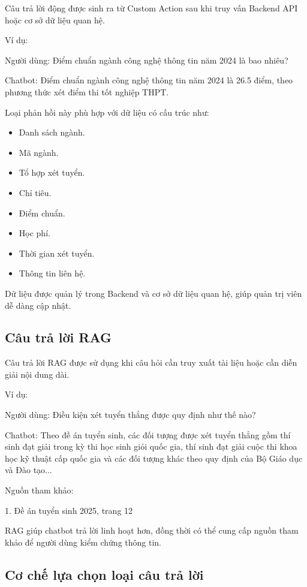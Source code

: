 Câu trả lời động được sinh ra từ Custom Action sau khi truy vấn Backend API hoặc cơ sở dữ liệu quan hệ.

Ví dụ:

Người dùng: Điểm chuẩn ngành công nghệ thông tin năm 2024 là bao nhiêu?

Chatbot: Điểm chuẩn ngành công nghệ thông tin năm 2024 là 26.5 điểm, theo phương thức xét điểm thi tốt nghiệp THPT.

Loại phản hồi này phù hợp với dữ liệu có cấu trúc như:
\begin{itemize}
    \item Danh sách ngành.
    \item Mã ngành.
    \item Tổ hợp xét tuyển.
    \item Chỉ tiêu.
    \item Điểm chuẩn.
    \item Học phí.
    \item Thời gian xét tuyển.
    \item Thông tin liên hệ.
\end{itemize}

Dữ liệu được quản lý trong Backend và cơ sở dữ liệu quan hệ, giúp quản trị viên dễ dàng cập nhật.

\subsection*{Câu trả lời RAG}

Câu trả lời RAG được sử dụng khi câu hỏi cần truy xuất tài liệu hoặc cần diễn giải nội dung dài.

Ví dụ:

Người dùng: Điều kiện xét tuyển thẳng được quy định như thế nào?

Chatbot: Theo đề án tuyển sinh, các đối tượng được xét tuyển thẳng gồm thí sinh đạt giải trong kỳ thi học sinh giỏi quốc gia, thí sinh đạt giải cuộc thi khoa học kỹ thuật cấp quốc gia và các đối tượng khác theo quy định của Bộ Giáo dục và Đào tạo...

Nguồn tham khảo:

1. Đề án tuyển sinh 2025, trang 12

RAG giúp chatbot trả lời linh hoạt hơn, đồng thời có thể cung cấp nguồn tham khảo để người dùng kiểm chứng thông tin.

\subsection*{Cơ chế lựa chọn loại câu trả lời}

